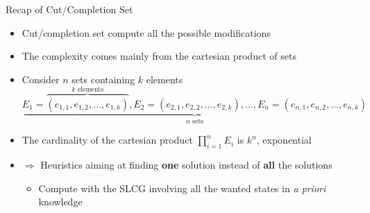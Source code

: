 \documentclass[8pt]{beamer}
\newcommand{\highlight}[1]{\textcolor{blue!50}{\textbf{#1}}}
\begin{document}
\begin{frame}{Recap of Cut/Completion Set}
    \begin{itemize}[<+->]
        \item Cut/completion set compute all the possible modifications
        \item The complexity comes mainly from the cartesian product of sets
        \item Consider $n$ sets containing $k$ elements
        $\underbrace{E_1=\overbrace{(e_{1,1},e_{1,2},\ldots,e_{1,k})}^\text{$k$ elements},E_2=(e_{2,1},e_{2,2},\ldots,e_{2,k}),\ldots,E_n=(e_{n,1},e_{n,2},\ldots,e_{n,k})}_\text{$n$ sets}$
        \item The cardinality of the cartesian product $\prod_{i=1}^{n}{E_i}$ is $k^n$, exponential
        \item$\Longrightarrow$ Heuristics aiming at finding \highlight{one} solution instead of \highlight{all} the solutions
        \begin{itemize}
            \item Compute with the SLCG involving all the wanted states in \textit{a priori} knowledge
        \end{itemize}
    \end{itemize}
\end{frame}
\end{document}
